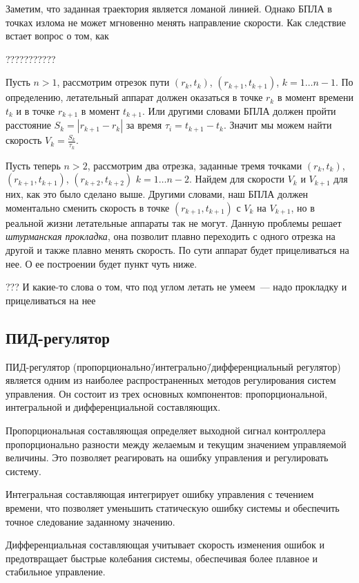 \documentclass[a4paper,12pt]{article}
\begin{document}
Заметим, что заданная траектория является ломаной линией. Однако БПЛА в точках излома не может мгновенно менять направление скорости. Как следствие встает вопрос о том, как 

???????????

Пусть $n>1$, рассмотрим отрезок пути $(r_k,t_k)$, $(r_{k+1},t_{k+1})$, $k=1\dots n-1$. По определению, летательный аппарат должен оказаться в точке $r_k$ в момент времени $t_k$ и в точке $r_{k+1}$ в момент $t_{k+1}$. Или другими словами БПЛА должен пройти расстояние $S_k= |r_{k+1} - r_{k}|$ за время $\tau_i = t_{k+1} - t_{k}$. Значит мы можем найти скорость $V_k = \frac{S_k}{\tau_k}$.

Пусть теперь $n>2$, рассмотрим два отрезка, заданные тремя точками $(r_k,t_k)$, $(r_{k+1},t_{k+1})$, $(r_{k+2},t_{k+2})$ $k=1\dots n-2$. Найдем для скорости $V_k$ и $V_{k+1}$ для них, как это было сделано выше. Другими словами, наш БПЛА должен моментально сменить скорость в точке $(r_{k+1},t_{k+1})$ с $V_k$ на $V_{k+1}$, но в реальной жизни летательные аппараты так не могут. Данную проблемы решает \textit{штурманская прокладка}, она позволит плавно переходить с одного отрезка на другой и также плавно менять скорость. По сути аппарат будет прицеливаться на нее. О ее построении будет пункт чуть ниже.

???
И какие-то слова о том, что под углом летать не умеем~--- надо прокладку и прицеливаться на нее

\subsection{ПИД-регулятор}
ПИД-регулятор (пропорционально\=/интегрально\=/дифференциальный регулятор) является одним из наиболее распространенных методов регулирования систем управления. Он состоит из трех основных компонентов: пропорциональной, интегральной и дифференциальной составляющих.

Пропорциональная составляющая определяет выходной сигнал контроллера пропорционально разности между желаемым и текущим значением управляемой величины. Это позволяет реагировать на ошибку управления и регулировать систему.

Интегральная составляющая интегрирует ошибку управления с течением времени, что позволяет уменьшить статическую ошибку системы и обеспечить точное следование заданному значению.

Дифференциальная составляющая учитывает скорость изменения ошибок и предотвращает быстрые колебания системы, обеспечивая более плавное и стабильное управление.
\end{document}
